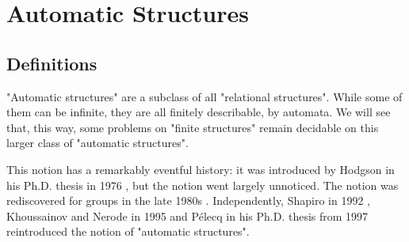 \section{Automatic Structures}
\label{sec:preliminaries-automatic-structures-automatic-structures}

\subsection{Definitions}

"Automatic structures" are a subclass of all "relational structures".
While some of them can be infinite, they are all finitely describable, by
automata. We will see that, this way, some problems on "finite structures"
remain decidable on this larger class of "automatic structures".

This notion has a remarkably eventful history:
it was introduced by Hodgson in his Ph.D. thesis in 1976
\cite{Hodgson1976PhD}%
, but
the notion went largely unnoticed. The notion was rediscovered for groups
in the late 1980s \cite{Epstein1992Word}. 
Independently, Shapiro in 1992 \cite{Shapiro1992AutomaticStructures},
Khoussainov and Nerode in 1995 \cite{KhoussainovNerode1995AutomaticPresentations}
and Pélecq in his Ph.D. thesis from 1997
\cite[\S~3.1.3, p.~91]{Pelecq1997Isomorphismes}
reintroduced the notion of "automatic structures".%



